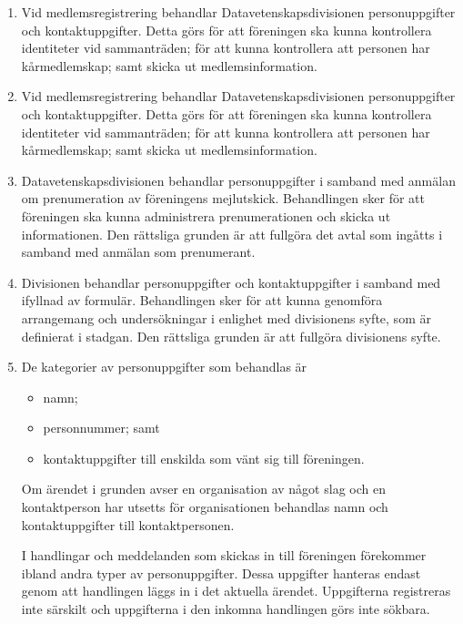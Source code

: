 \documentclass{dvd}
\begin{document}
    \begin{enumerate}[label=\arabic* \S, ref=\arabic*]
        \item Vid medlemsregistrering behandlar Datavetenskapsdivisionen personuppgifter och kontaktuppgifter.
        Detta görs för att föreningen ska kunna kontrollera identiteter vid sammanträden; för att kunna kontrollera att personen har kårmedlemskap; samt skicka ut medlemsinformation.

        \item Vid medlemsregistrering behandlar Datavetenskapsdivisionen personuppgifter och kontaktuppgifter.
        Detta görs för att föreningen ska kunna kontrollera identiteter vid sammanträden; för att kunna kontrollera att personen har kårmedlemskap; samt skicka ut medlemsinformation.

        \item Datavetenskapsdivisionen behandlar personuppgifter i samband med anmälan om prenumeration av föreningens mejlutskick.
		Behandlingen sker för att föreningen ska kunna administrera prenumerationen och skicka ut informationen.
		Den rättsliga grunden är att fullgöra det avtal som ingåtts i samband med anmälan som prenumerant.

		\item Divisionen behandlar personuppgifter och kontaktuppgifter i samband med ifyllnad av formulär.
        Behandlingen sker för att kunna genomföra arrangemang och undersökningar i enlighet med divisionens syfte, som är definierat i stadgan.
        Den rättsliga grunden är att fullgöra divisionens syfte.

        \item De kategorier av personuppgifter som behandlas är

		\begin{itemize}
		  \item namn;
		  \item personnummer; samt
		  \item kontaktuppgifter till enskilda som vänt sig till föreningen.
		\end{itemize}

		Om ärendet i grunden avser en organisation av något slag och en kontaktperson har utsetts för organisationen behandlas namn och kontaktuppgifter till kontaktpersonen.

		I handlingar och meddelanden som skickas in till föreningen förekommer ibland andra typer av personuppgifter.
		Dessa uppgifter hanteras endast genom att handlingen läggs in i det aktuella ärendet.
		Uppgifterna registreras inte särskilt och uppgifterna i den inkomna handlingen görs inte sökbara.


\end{enumerate}
\end{document}
